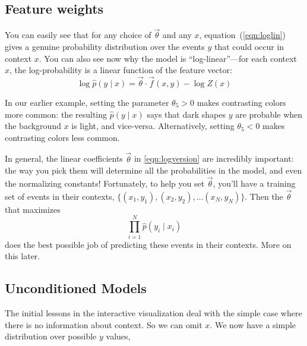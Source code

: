 \documentclass[11pt]{article}
\newcommand{\vtheta}{\vec{\theta}}
\newcommand{\ph}{\hat{p}}
\begin{document}
\subsection{Feature weights}

You can easily see that for any choice of $\vtheta$ and any $x$,
equation~(\ref{eqn:loglin}) gives a genuine probability distribution
over the events $y$ that could occur in context $x$.  You can also see
now why the model is ``log-linear''---for each context $x$, the
log-probability is a linear function of the feature vector:
\begin{equation}\label{eqn:logversion}
\log \ph(y \mid x) = \vtheta \cdot \vec{f}(x,y) - \log Z(x)
\end{equation}


In our earlier example, setting the parameter $\theta_5 > 0$ makes
contrasting colors more common: the resulting $\ph(y \mid x)$ says
that dark shapes $y$ are probable when the background $x$ is light,
and vice-versa.  Alternatively, setting $\theta_5 < 0$ makes
contrasting colors less common.

\medskip
In general, the linear coefficients $\vtheta$ in \eqref{eqn:logversion} are incredibly
important: the way you pick them will determine all the probabilities
in the model, and even the normalizing constants!  Fortunately, to
help you set $\vtheta$, you'll have a training set of events in their
contexts, $\{(x_1,y_1), (x_2,y_2), \ldots (x_N,y_N)\}$.  Then the
$\vtheta$ that maximizes
\begin{equation}\label{eqn:loglin-likelihood}
\prod_{i=1}^N \ph(y_i \mid x_i)
\end{equation}
does the best possible job of predicting these events in their
contexts.  More on this later.

\subsection{Unconditioned Models}\label{sec:unconditioned}

The initial lessons in the interactive visualization deal with the
simple case where there is no information about context.  So we can
omit $x$.  We now have a simple distribution over possible $y$ values,
\end{document}
